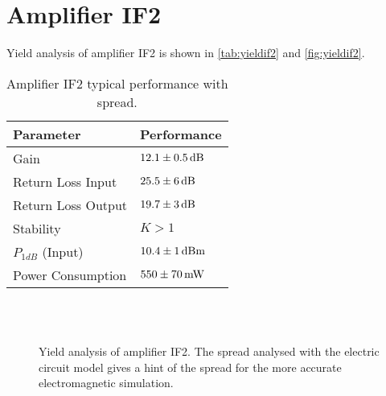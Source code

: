 	\section{Amplifier IF2}\label{sec:yieldif2}
		Yield analysis of amplifier IF2 is shown in \autoref{tab:yieldif2} and \autoref{fig:yieldif2}.
		
		\begin{table}[hbt!]
			\caption[Amplifier IF2 performance with spread.]{Amplifier IF2 typical performance with spread.}
			\label{tab:yieldif2}
			\centering
			\begin{tabular}{ l l } \toprule
				Parameter & Performance \\\midrule
				Gain & $\unit[12.1\pm 0.5]{dB}$ \\
				Return Loss Input & $\unit[25.5\pm 6]{dB}$ \\
				Return Loss Output & $\unit[19.7\pm 3]{dB}$ \\
				Stability & $K>1$ \\
				$P_{1dB}$ (Input) & $\unit[10.4\pm 1]{dBm}$ \\
				Power Consumption &  $\unit[550\pm 70]{mW}$ \\\bottomrule
			\end{tabular}
		\end{table}
		
		\begin{figure}[hp!]
			\centering 
			 \\
			 \\
			\caption[Yield analysis of amplifier IF2.]{Yield analysis of amplifier IF2. The spread analysed with the electric circuit model gives a hint of the spread for the more accurate electromagnetic simulation.}\label{fig:yieldif2}
		\end{figure}
		
